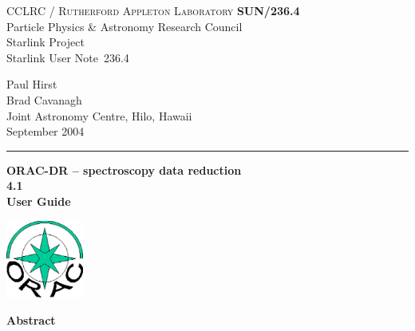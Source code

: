 \documentclass[twoside,11pt]{article}
\newcommand{\stardoccategory}  {Starlink User Note}
\newcommand{\stardocinitials}  {SUN}
\newcommand{\stardocnumber}    {236.4}
\newcommand{\stardocauthors}   {Paul Hirst \\ Brad Cavanagh \\
                                Joint Astronomy Centre, Hilo, Hawaii}
\newcommand{\stardocdate}      {September 2004}
\newcommand{\stardoctitle}     {ORAC-DR -- spectroscopy data reduction}
\newcommand{\stardocversion}   {4.1}
\newcommand{\stardocmanual}    {User Guide}
\newcommand{\stardocname}{\stardocinitials /\stardocnumber}
\newenvironment{latexonly}{}{}
\renewcommand{\_}{\texttt{\symbol{95}}}
\begin{document}
\setcounter{secnumdepth}{5}
\thispagestyle{empty}

\begin{latexonly}
   CCLRC / \textsc{Rutherford Appleton Laboratory} \hfill \textbf{\stardocname}\\
   {\large Particle Physics \& Astronomy Research Council}\\
   {\large Starlink Project\\}
   {\large \stardoccategory\ \stardocnumber}
   \begin{flushright}
   \stardocauthors\\
   \stardocdate
   \end{flushright}
   \vspace{-4mm}
   \rule{\textwidth}{0.5mm}
   \vspace{5mm}
   \begin{center}
   {\Huge\textbf{\stardoctitle \\ [2.5ex]}}
   {\LARGE\textbf{\stardocversion \\ [4ex]}}
   {\Huge\textbf{\stardocmanual}}
   \end{center}
   \vspace{5mm}

\begin{center}
\includegraphics[width=1.0in]{sun236_logo.eps}
\end{center}

   \vspace{10mm}
   \begin{center}
      {\Large\textbf{Abstract}}
   \end{center}
\end{latexonly}
\end{document}
